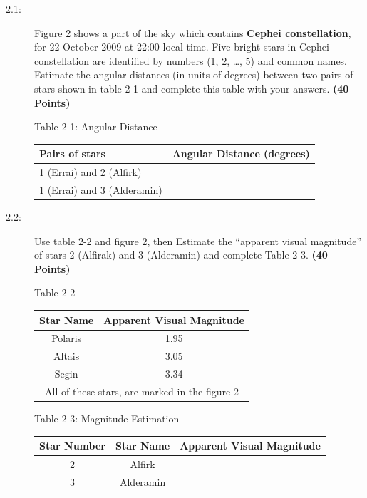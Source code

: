\begin{description}
\item[2.1:] Figure 2 shows a part of the sky which contains \textbf{Cephei
  constellation}, for 22 October 2009 at 22:00 local time. Five bright stars
  in Cephei constellation are identified by numbers (1, 2, \dots, 5) and
  common names. Estimate the angular distances (in units of degrees) between
  two pairs of stars shown in table 2-1 and complete this table with your
  answers. \textbf{(40 Points)}

  \medskip
  \noindent Table 2-1: Angular Distance

  \begin{center}
  \begin{tabular}{lc}
  \hline
  Pairs of stars & Angular Distance (degrees) \\
  \hline
  1 (Errai) and 2 (Alfirk) & \\
  1 (Errai) and 3 (Alderamin) & \\
  \hline
  \end{tabular}
  \end{center}

\item[2.2:] Use table 2-2 and figure 2, then Estimate the ``apparent visual
  magnitude'' of stars 2 (Alfirak) and 3 (Alderamin) and complete Table 2-3.
  \textbf{(40 Points)}

  \medskip
  \noindent Table 2-2

  \begin{center}
  \begin{tabular}{cc}
  \hline
  Star Name & Apparent Visual Magnitude \\
  \hline
  Polaris & 1.95 \\
  Altais & 3.05 \\
  Segin & 3.34 \\
  \hline
  \multicolumn{2}{c}{All of these stars, are marked in the figure 2} \\
  \hline
  \end{tabular}
  \end{center}

  \medskip
  \noindent Table 2-3: Magnitude Estimation

  \begin{center}
  \begin{tabular}{ccc}
  \hline
  Star Number & Star Name & Apparent Visual Magnitude \\
  \hline
  2 & Alfirk & \\
  3 & Alderamin & \\
  \hline
  \end{tabular}
  \end{center}
\end{description}

